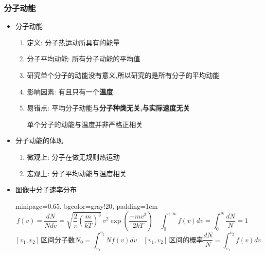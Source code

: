 \documentclass{article}
\begin{document}
\subsubsection{分子动能}
\begin{itemize}
    \item 分子动能
          \begin{enumerate}[label = (\arabic*)]
              \item 定义: 分子热运动所具有的能量
              \item 分子平均动能: 所有分子动能的平均值
              \item 研究单个分子的动能没有意义,所以研究的是所有分子的平均动能
              \item 影响因素: 有且只有一个\textbf{温度}
              \item 易错点: 平均分子动能与\textbf{分子种类无关,与实际速度无关}

                    \hspace{3.7em}单个分子的动能与温度并非严格正相关
          \end{enumerate}
    \item 分子动能的体现
          \begin{enumerate}[label = (\arabic*)]
              \item 微观上: 分子在做无规则热运动
              \item 宏观上: 分子平均动能与温度相关
          \end{enumerate}
    \item 图像中分子速率分布

          \vspace{-1em}
          \hspace{-0.9em}\begin{adjustbox}{minipage=0.65\linewidth, bgcolor=gray!20, padding=1em}
              \small %
              $$ f(v)= \frac{dN}{Ndv} ={\sqrt {{\frac {2}{\pi }}\left({\frac {m}{kT}}\right)^{3}}}\,v^{2}\exp \left({\frac {-mv^{2}}{2kT}}\right)  \quad
                  \int_{0}^{+\infty} f(v) dv  = \int_{0}^{N} \frac{dN}{N} = 1
              $$
              $$
                  [v_{1},v_{2}] \, \text{区间分子数} N_{0} = \int_{v_{1}}^{v_{2}} N f(v) dv  \quad [v_{1},v_{2}] \, \text{区间的概率} \frac{dN}{N} = \int_{v_{1}}^{v_{2}} f(v) dv
              $$
          \end{adjustbox}
          \vspace{-1em}


\end{itemize}
\end{document}
